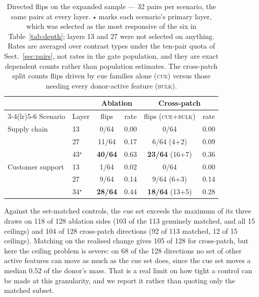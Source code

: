 \documentclass{article}
\begin{document}
\begin{table}[t]
\caption{Directed flips on the expanded sample --- 32 pairs per scenario, the same pairs at every layer. $\star$ marks each scenario's primary layer, which was selected as the most responsive of the six in Table~\ref{tab:depth}; layers 13 and 27 were not selected on anything. Rates are averaged over contrast types under the ten-pair quota of Sect.~\ref{sec:pairs}, not rates in the gate population, and they are exact dependent counts rather than population estimates. The cross-patch split counts flips driven by cue families alone (\textsc{cue}) versus those needing every donor-active feature (\textsc{bulk}).}
\label{tab:expanded}
\centering
\small
\setlength{\tabcolsep}{5pt}
\begin{tabular}{@{}llcccc@{}}
\toprule
& & \multicolumn{2}{c}{Ablation} & \multicolumn{2}{c}{Cross-patch} \\
\cmidrule(lr){3-4}\cmidrule(lr){5-6}
Scenario & Layer & flips & rate & flips (\textsc{cue}+\textsc{bulk}) & rate \\
\midrule
Supply chain     & 13          & 0/64           & 0.00 & 0/64          & 0.00 \\
                 & 27          & 11/64          & 0.17 & 6/64 (4+2)    & 0.09 \\
                 & 43$^{\star}$ & \textbf{40/64} & 0.63 & \textbf{23/64} (16+7) & 0.36 \\
\addlinespace
Customer support & 13          & 1/64           & 0.02 & 0/64          & 0.00 \\
                 & 27          & 9/64           & 0.14 & 9/64 (6+3)    & 0.14 \\
                 & 34$^{\star}$ & \textbf{28/64} & 0.44 & \textbf{18/64} (13+5) & 0.28 \\
\bottomrule
\end{tabular}
\end{table}

Against the set-matched controls, the cue set exceeds the maximum of its three draws on 118 of 128 ablation sides (103 of the 113 genuinely matched, and all 15 ceilings) and 104 of 128 cross-patch directions (92 of 113 matched, 12 of 15 ceilings). Matching on the realised change gives 105 of 128 for cross-patch, but here the ceiling problem is severe: on 68 of the 128 directions no set of other active features can move as much as the cue set does, since the cue set moves a median 0.52 of the donor's mass. That is a real limit on how tight a control can be made at this granularity, and we report it rather than quoting only the matched subset.
\end{document}
